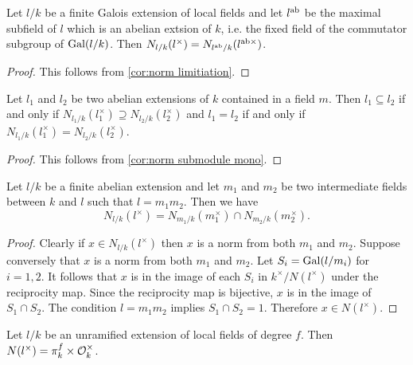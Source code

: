 \begin{theorem} \label{thm:local norm limitation}
	Let $l/k$ be a finite Galois extension of local fields and let $l^{\mathrm{ab}}$ be the
	maximal subfield of $l$ which is an abelian extsion of $k$, i.e. the fixed field of
	the commutator subgroup of $\mathrm{Gal}(l/k)$.
	Then $N_{l/k}(l^\times) = N_{l^{\mathrm{ab}}/k}(l^{\mathrm{ab}\times})$.
\end{theorem}

\begin{proof}
	This follows from \ref{cor:norm limitiation}.
\end{proof}



\begin{theorem} \label{lem:local abelian classification}
	Let $l_1$ and $l_2$ be two abelian extensions of $k$ contained in a field $m$.
	Then $l_1 \subseteq l_2$ if and only if $N_{l_1/k}(l_1^\times) \supseteq N_{l_2/k}(l_2^\times)$
	and $l_1 = l_2$ if and only if $N_{l_1/k}(l_1^\times) = N_{l_2/k}(l_2^\times)$.
\end{theorem}

\begin{proof}
	This follows from \ref{cor:norm submodule mono}.
\end{proof}



\begin{lemma} \label{lem:norm composite intersection}
	Let $l/k$ be a finite abelian extension and let $m_1$ and $m_2$ be two intermediate
	fields between $k$ and $l$ such that $l = m_1 m_2$.
	Then we have
	\[
		N_{l/k}(l^\times) = N_{m_1/k} (m_1^\times) \cap N_{m_2/k} (m_2^\times).
	\]
\end{lemma}

\begin{proof}
	Clearly if $x \in N_{l/k}(l^\times)$ then $x$ is a norm from both $m_1$ and $m_2$.
	Suppose conversely that $x$ is a norm from both $m_1$ and $m_2$.
	Let $S_i=\mathrm{Gal}(l/m_i)$ for $i=1,2$.
	It follows that $x$ is in the image of each $S_i$ in $k^\times / N(l^\times)$
	under the reciprocity map.
	Since the reciprocity map is bijective, $x$ is in the image of
	$S_1 \cap S_2$.
	The condition $l = m_1 m_2$ implies $S_1 \cap S_2 = 1$.
	Therefore $x \in N(l^\times)$.
\end{proof}



\begin{lemma} \label{lem:local unramified norms}
	Let $l/k$ be an unramified extension of local fields of degree $f$.
	Then $N(l^\times) = \pi_k^f \times {\mathcal O}_k^\times$.
\end{lemma}

